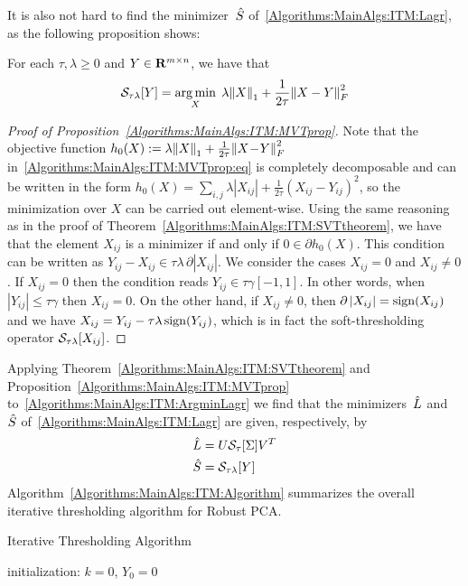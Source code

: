 It is also not hard to find the minimizer~${\hat{S}}$ of~\eqref{Algorithms:MainAlgs:ITM:Lagr}, as the following proposition shows:\\

\begin{proposition}
For each $\tau,\lambda \geq 0$ and $Y\in {\mathbf R}^{m\times n}$, we have that
\begin{align}
{\mathcal{S}}_{\tau\lambda}[Y] = \operatorname*{arg\,min}_X \; \lambda {\left\|X\right\|}_{1}^{} + \frac{1}{2\tau} {\left\|X-Y\right\|}_{F}^{2}
\label{Algorithms:MainAlgs:ITM:MVTprop:eq}
\end{align}
\label{Algorithms:MainAlgs:ITM:MVTprop}
\end{proposition}
%
\begin{proof}[Proof of Proposition~\ref{Algorithms:MainAlgs:ITM:MVTprop}] 
Note that the objective function $h_0(X) := \lambda {\left\|X\right\|}_{1}^{} + \frac{1}{2\tau} {\left\|X\!-\!Y\right\|}_{F}^{2}$ in~\eqref{Algorithms:MainAlgs:ITM:MVTprop:eq} is completely decomposable and can be written in the form $h_0(X) = \sum_{i,j} \lambda |X_{ij}| + \frac{1}{2\tau} (X_{ij}\!-\!Y_{ij})^2$, so the minimization over $X$ can be carried out element-wise. Using the same reasoning as in the proof of Theorem~\ref{Algorithms:MainAlgs:ITM:SVTtheorem}, we have that the element $X_{ij}$ is a minimizer if and only if $0 \in \partial h_0(X)$. This condition can be written as $Y_{ij}-X_{ij} \in \tau \lambda\, \partial |X_{ij}|$. We consider the cases $X_{ij} =0$ and $X_{ij} \neq 0$. If $X_{ij} =0$ then the condition reads $Y_{ij} \in \tau \gamma [-1,1]$. In other words, when $|Y_{ij}| \leq \tau \gamma$ then $X_{ij}=0$. On the other hand, if $X_{ij} \neq 0$, then  $\partial \, |X_{ij}| = \operatorname{sign}(X_{ij})$ and we have $X_{ij}= Y_{ij} -\tau\lambda \operatorname{sign}(Y_{ij})$, which is in fact the soft-thresholding operator ${\mathcal{S}}_{\tau\lambda}[X_{ij}]$.
\end{proof}


Applying Theorem~\ref{Algorithms:MainAlgs:ITM:SVTtheorem} and Proposition~\ref{Algorithms:MainAlgs:ITM:MVTprop} to~\eqref{Algorithms:MainAlgs:ITM:ArgminLagr} we find that the minimizers~${\hat{L}}$ and~${\hat{S}}$ of~\eqref{Algorithms:MainAlgs:ITM:Lagr} are given, respectively, by 
%
\begin{align}
{\hat{L}} &= U {\mathcal{S}}_\tau[\Sigma] V^T
\label{Algorithms:MainAlgs:ITM:ArgminLhat} \\
{\hat{S}} &= {\mathcal{S}}_{\tau\lambda}[Y]
\label{Algorithms:MainAlgs:ITM:ArgminShat}
\end{align}
%
%
Algorithm~\ref{Algorithms:MainAlgs:ITM:Algorithm} summarizes the overall iterative thresholding algorithm for Robust PCA. 
%
\begin{algorithm}
\caption{Iterative Thresholding Algorithm}
initialization: $k=0$, $Y_0 = 0$\;
\label{Algorithms:MainAlgs:ITM:Algorithm}
\end{algorithm}

